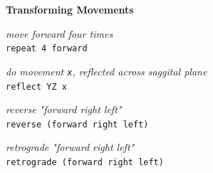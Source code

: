 \documentclass[landscape,a0paper,fontscale=0.3]{baposter} %
\newcommand{\compresslist}{ %
\setlength{\itemsep}{1pt}
\setlength{\parskip}{0pt}
\setlength{\parsep}{0pt}
}
\begin{document}
\begin{poster}
{\vspace{-1em}

\begin{center}
\textbf{Transforming Movements}
\end{center}

\emph{move forward four times} \\
\texttt{repeat 4 forward} \\

\vspace{-0.5em}

\emph{do movement \texttt{x}, reflected across saggital plane} \\
\texttt{reflect YZ x} \\

\vspace{-0.5em}

\emph{reverse "forward right left"} \\
\texttt{reverse (forward right left)} \\

\vspace{-0.5em}

\emph{retrograde "forward right left"} \\
\texttt{retrograde (forward right left)} 
}


%
%
%
%
%


\end{poster}
\end{document}

